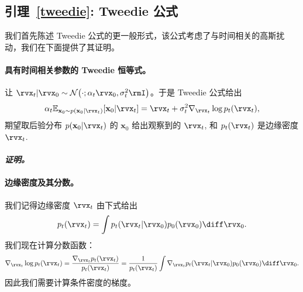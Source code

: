 \subsection{引理~\ref{tweedie}: Tweedie 公式}\label{app-sec:tweedie}
我们首先陈述 Tweedie 公式的更一般形式，该公式考虑了与时间相关的高斯扰动，我们在下面提供了其证明。


\paragraph{具有时间相关参数的 Tweedie 恒等式。}
让
$\rvx_t|\rvx_0 \sim
\mathcal{N}\big(\cdot; \alpha_t\rvx_0, \sigma_t^2\rmI\big)$。于是 Tweedie 公式给出
\begin{align*}
\alpha_t \mathbb{E}_{\mathbf{x}_0 \sim p(\mathbf{x}_0|\rvx_t)}[\mathbf{x}_0|\rvx_t] = \rvx_t + \sigma_t^2 \nabla_{\rvx_t} \log p_t(\rvx_t),
\end{align*}
期望取后验分布 $p(\mathbf{x}_0|\rvx_t)$ 的 $\mathbf{x}_0$ 给出观察到的 $\rvx_t$, 和 $p_t(\rvx_t)$ 是边缘密度 $\rvx_t$.


\paragraph{\textit{证明。}}


\paragraph{边缘密度及其分数。}
我们记得边缘密度 $\rvx_t$ 由下式给出
\begin{align*}
p_t(\rvx_t) = \int p_t(\rvx_t|\rvx_0)  p_0(\rvx_0)  \diff\rvx_0.
\end{align*}
我们现在计算分数函数：
\begin{align*}
\nabla_{\rvx_t} \log p_t(\rvx_t)
= \frac{\nabla_{\rvx_t} p_t(\rvx_t)}{p_t(\rvx_t)} = \frac{1}{p_t(\rvx_t)} \int \nabla_{\rvx_t} p_t(\rvx_t|\rvx_0)  p_0(\rvx_0)  \diff\rvx_0.
\end{align*}
因此我们需要计算条件密度的梯度。

